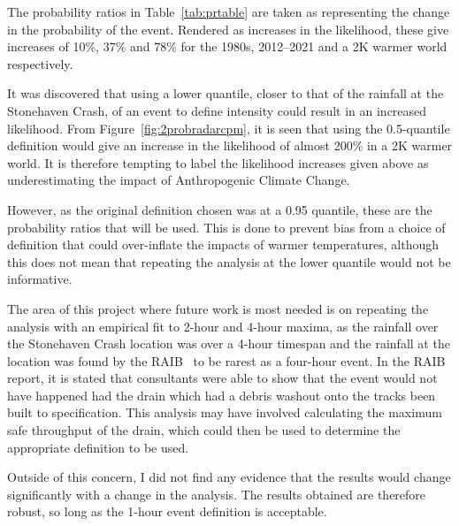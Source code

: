 \documentclass[12pt,a4paper,openany]{report}
\begin{document}

The probability ratios in Table~\ref{tab:prtable}
    are taken as representing the change in the probability of the event.
Rendered as increases in the likelihood,
    these give increases of 10\%, 37\% and 78\% for the 1980s, 2012--2021 and a 2K warmer world respectively.

It was discovered that using a lower quantile,
    closer to that of the rainfall at the Stonehaven Crash,
    of an event to define intensity could result in an increased likelihood.
From Figure~\ref{fig:2probradarcpm},
    it is seen that using the 0.5-quantile definition would give an increase
    in the likelihood of almost 200\% in a 2K warmer world.
It is therefore tempting to label the likelihood increases given above as underestimating
    the impact of Anthropogenic Climate Change.

However,
    as the original definition chosen was at a 0.95 quantile,
    these are the probability ratios that will be used.
This is done to prevent bias from a choice of definition that could over-inflate
    the impacts of warmer temperatures,
    although this does not mean that repeating the analysis at the lower quantile would not be informative.

The area of this project where future work is most needed is on repeating the analysis
    with an empirical fit to 2-hour and 4-hour maxima,
    as the rainfall over the Stonehaven Crash location was over a 4-hour timespan
    and the rainfall at the location was found by the RAIB~\cite{RAIB_2022}
    to be rarest as a four-hour event.
In the RAIB report,
    it is stated that consultants were able to show that the event would not have happened
    had the drain which had a debris washout onto the tracks been built to specification.
This analysis may have involved calculating the maximum safe throughput of the drain,
    which could then be used to determine the appropriate definition to be used.

Outside of this concern,
    I did not find any evidence that the results would change significantly
    with a change in the analysis.
The results obtained are therefore robust,
    so long as the 1-hour event definition is acceptable.
\end{document}

